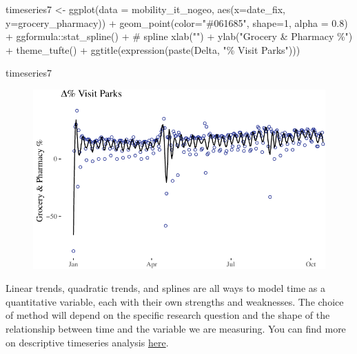 \documentclass[
  letterpaper,
  DIV=11,
  numbers=noendperiod]{scrreprt}
\newenvironment{Shaded}{\begin{snugshade}}{\end{snugshade}}
\newcommand{\AttributeTok}[1]{\textcolor[rgb]{0.40,0.45,0.13}{#1}}
\newcommand{\CommentTok}[1]{\textcolor[rgb]{0.37,0.37,0.37}{#1}}
\newcommand{\DecValTok}[1]{\textcolor[rgb]{0.68,0.00,0.00}{#1}}
\newcommand{\FloatTok}[1]{\textcolor[rgb]{0.68,0.00,0.00}{#1}}
\newcommand{\FunctionTok}[1]{\textcolor[rgb]{0.28,0.35,0.67}{#1}}
\newcommand{\NormalTok}[1]{\textcolor[rgb]{0.00,0.23,0.31}{#1}}
\newcommand{\OtherTok}[1]{\textcolor[rgb]{0.00,0.23,0.31}{#1}}
\newcommand{\SpecialCharTok}[1]{\textcolor[rgb]{0.37,0.37,0.37}{#1}}
\newcommand{\StringTok}[1]{\textcolor[rgb]{0.13,0.47,0.30}{#1}}
\begin{document}
\begin{Shaded}
\begin{Highlighting}[]
\NormalTok{timeseries7 }\OtherTok{\textless{}{-}} \FunctionTok{ggplot}\NormalTok{(}\AttributeTok{data =}\NormalTok{ mobility\_it\_nogeo, }\FunctionTok{aes}\NormalTok{(}\AttributeTok{x=}\NormalTok{date\_fix, }\AttributeTok{y=}\NormalTok{grocery\_pharmacy)) }\SpecialCharTok{+}
  \FunctionTok{geom\_point}\NormalTok{(}\AttributeTok{color=}\StringTok{"\#061685"}\NormalTok{, }\AttributeTok{shape=}\DecValTok{1}\NormalTok{, }\AttributeTok{alpha =} \FloatTok{0.8}\NormalTok{) }\SpecialCharTok{+}
\NormalTok{  ggformula}\SpecialCharTok{::}\FunctionTok{stat\_spline}\NormalTok{() }\SpecialCharTok{+} \CommentTok{\# spline}
  \FunctionTok{xlab}\NormalTok{(}\StringTok{""}\NormalTok{) }\SpecialCharTok{+}
  \FunctionTok{ylab}\NormalTok{(}\StringTok{"Grocery \& Pharmacy \%"}\NormalTok{) }\SpecialCharTok{+}
 \FunctionTok{theme\_tufte}\NormalTok{() }\SpecialCharTok{+}
  \FunctionTok{ggtitle}\NormalTok{(}\FunctionTok{expression}\NormalTok{(}\FunctionTok{paste}\NormalTok{(Delta, }\StringTok{"\% Visit Parks"}\NormalTok{)))}
  
\NormalTok{timeseries7}
\end{Highlighting}
\end{Shaded}

\begin{figure}[H]

{\centering \includegraphics{longitudinal-1_files/figure-pdf/unnamed-chunk-15-1.pdf}

}

\end{figure}

Linear trends, quadratic trends, and splines are all ways to model time
as a quantitative variable, each with their own strengths and
weaknesses. The choice of method will depend on the specific research
question and the shape of the relationship between time and the variable
we are measuring. You can find more on descriptive timeseries analysis
\href{http://r-statistics.co/Time-Series-Analysis-With-R.html?utm_content=cmp-true}{here}.
\end{document}
